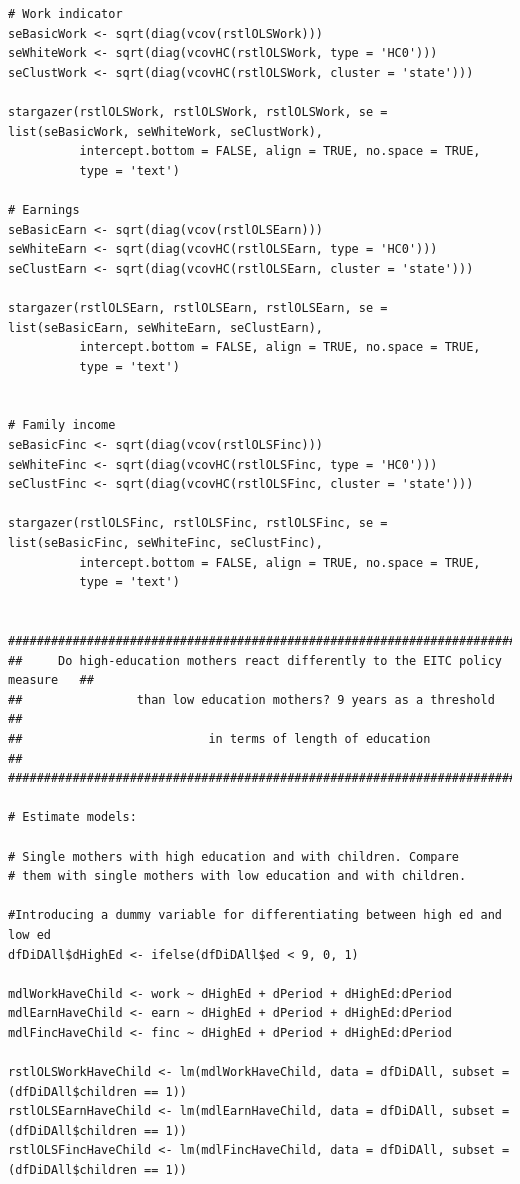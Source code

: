 \documentclass{article}
\begin{document}
\begin{tiny}
\begin{verbatim}
# Work indicator
seBasicWork <- sqrt(diag(vcov(rstlOLSWork)))
seWhiteWork <- sqrt(diag(vcovHC(rstlOLSWork, type = 'HC0')))
seClustWork <- sqrt(diag(vcovHC(rstlOLSWork, cluster = 'state')))

stargazer(rstlOLSWork, rstlOLSWork, rstlOLSWork, se = list(seBasicWork, seWhiteWork, seClustWork),
          intercept.bottom = FALSE, align = TRUE, no.space = TRUE, 
          type = 'text')

# Earnings
seBasicEarn <- sqrt(diag(vcov(rstlOLSEarn)))
seWhiteEarn <- sqrt(diag(vcovHC(rstlOLSEarn, type = 'HC0')))
seClustEarn <- sqrt(diag(vcovHC(rstlOLSEarn, cluster = 'state')))

stargazer(rstlOLSEarn, rstlOLSEarn, rstlOLSEarn, se = list(seBasicEarn, seWhiteEarn, seClustEarn),
          intercept.bottom = FALSE, align = TRUE, no.space = TRUE, 
          type = 'text')


# Family income
seBasicFinc <- sqrt(diag(vcov(rstlOLSFinc)))
seWhiteFinc <- sqrt(diag(vcovHC(rstlOLSFinc, type = 'HC0')))
seClustFinc <- sqrt(diag(vcovHC(rstlOLSFinc, cluster = 'state')))

stargazer(rstlOLSFinc, rstlOLSFinc, rstlOLSFinc, se = list(seBasicFinc, seWhiteFinc, seClustFinc),
          intercept.bottom = FALSE, align = TRUE, no.space = TRUE, 
          type = 'text')


##################################################################################
##     Do high-education mothers react differently to the EITC policy measure   ##
##                than low education mothers? 9 years as a threshold            ##
##                          in terms of length of education                     ##
##################################################################################

# Estimate models:

# Single mothers with high education and with children. Compare
# them with single mothers with low education and with children.

#Introducing a dummy variable for differentiating between high ed and low ed
dfDiDAll$dHighEd <- ifelse(dfDiDAll$ed < 9, 0, 1)

mdlWorkHaveChild <- work ~ dHighEd + dPeriod + dHighEd:dPeriod
mdlEarnHaveChild <- earn ~ dHighEd + dPeriod + dHighEd:dPeriod
mdlFincHaveChild <- finc ~ dHighEd + dPeriod + dHighEd:dPeriod

rstlOLSWorkHaveChild <- lm(mdlWorkHaveChild, data = dfDiDAll, subset = (dfDiDAll$children == 1))
rstlOLSEarnHaveChild <- lm(mdlEarnHaveChild, data = dfDiDAll, subset = (dfDiDAll$children == 1))
rstlOLSFincHaveChild <- lm(mdlFincHaveChild, data = dfDiDAll, subset = (dfDiDAll$children == 1))


\end{verbatim}
\end{tiny}
\end{document}
